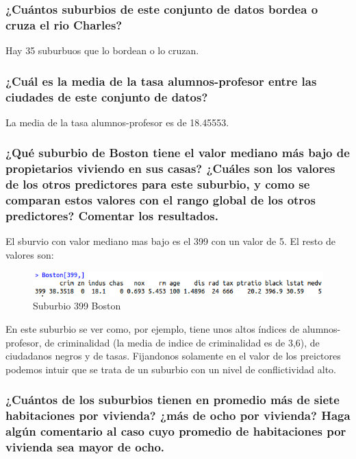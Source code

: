 \subsubsection{¿Cuántos suburbios de este conjunto de datos bordea o cruza el rio Charles?}

Hay 35 suburbuos que lo bordean o lo cruzan.

\subsubsection{¿Cuál es la media de la tasa alumnos-profesor entre las ciudades de este conjunto de datos?}

La media de la tasa alumnos-profesor es de 18.45553.

\subsubsection{¿Qué suburbio de Boston tiene el valor mediano más bajo de propietarios viviendo en sus casas? ¿Cuáles son los valores de los otros predictores para este suburbio, y como se comparan estos valores con el rango global de los otros predictores? Comentar los resultados.}

El sburvio con valor mediano mas bajo es el 399 con un valor de 5. El resto de valores son:

\begin{figure}[H]
\centering
\includegraphics[scale=.70]{boston399.png}
\caption{Suburbio 399 Boston}
\label{}
\end{figure}

En este suburbio se ver como, por ejemplo, tiene unos altos índices de alumnos-profesor, de criminalidad (la media de indice de criminalidad es de 3,6), de ciudadanos negros y de tasas. Fijandonos solamente en el valor de los preictores podemos intuir que se trata de un suburbio con un nivel de conflictividad alto.

\subsubsection{¿Cuántos de los suburbios tienen en promedio más de siete habitaciones por vivienda? ¿más de ocho por vivienda? Haga algún comentario al caso cuyo promedio de habitaciones por vivienda sea mayor de ocho.}

